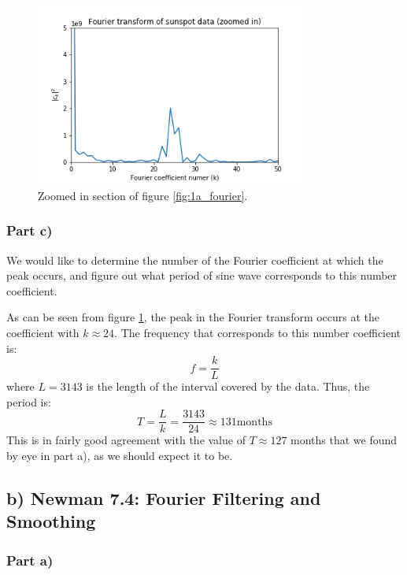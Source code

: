 \documentclass{article}
\begin{document}
\begin{figure}[H]
	\centering
	\includegraphics[width=0.8\textwidth]{../images/1a_fourier_zoomed.png}
	\caption{Zoomed in section of figure \ref{fig:1a_fourier}.}
	\label{fig:1a_fourier_zoom}
\end{figure}

\subsubsection{Part c)}

We would like to determine the number of the Fourier coefficient at which the peak occurs, and figure out what period of sine wave corresponds to this number coefficient.

As can be seen from figure \ref{fig:1a_fourier_zoom}, the peak in the Fourier transform occurs at the coefficient with $k\approx 24$. The frequency that corresponds to this number coefficient is:
\begin{equation*}
	f = \frac{k}{L}
\end{equation*}
where $L = 3143$ is the length of the interval covered by the data. Thus, the period is:
\begin{equation*}
	T = \frac{L}{k} = \frac{3143}{24} \approx 131 \text{months}
\end{equation*}
This is in fairly good agreement with the value of $T\approx 127$ months that we found by eye in part a), as we should expect it to be.

\subsection{b) Newman 7.4: Fourier Filtering and Smoothing}

\subsubsection{Part a)}
\end{document}
